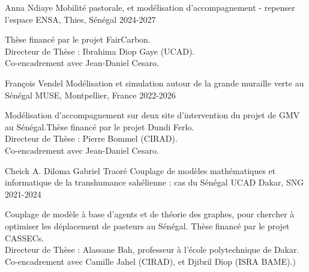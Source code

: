
\vspace{1em}

\begin{cventries}
  \cventry
    {Anna Ndiaye} %
    {Mobilité pastorale, et modélisation d'accompagnement - repenser l'espace } %
    {ENSA, Thies, Sénégal} %
    {2024-2027} %
    {
      \begin{cvitems} %
        Thèse financé par le projet FairCarbon.\\
        Directeur de Thèse : Ibrahima Diop Gaye (UCAD).\\
        Co-encadrement avec Jean-Daniel Cesaro.
      \end{cvitems}
  }
  \cventry
  {François Vendel} %
  {Modélisation et simulation autour de la grande muraille verte au Sénégal} %
  {MUSE, Montpellier, France} %
  {2022-2026} %
  {
    \begin{cvitems} %
      Modélisation d'accompagnement sur deux site d'intervention du projet de GMV au Sénégal.Thèse financé par le projet Dundi Ferlo.\\
      Directeur de Thèse : Pierre Bommel (CIRAD).\\
      Co-encadrement avec Jean-Daniel Cesaro.
    \end{cvitems}
  }
  \cventry
  {Cheick A. Diloma Gabriel Traoré} %
  {Couplage de modèles mathématiques et informatique de la transhumance sahélienne : cas du Sénégal} %
  {UCAD Dakar, SNG} %
  {2021-2024} %
  {
    \begin{cvitems} %
      Couplage de modèle à base d'agents et de théorie des graphes, pour chercher à optimiser les déplacement de pasteurs au Sénégal. Thèse financé par le projet CASSECs.\\
      Directeur de Thèse : Alassane Bah, professeur à l'école polytechnique de Dakar.\\
      Co-encadrement avec Camille Jahel (CIRAD), et Djibril Diop (ISRA BAME).)
    \end{cvitems}
  }


\end{cventries}
